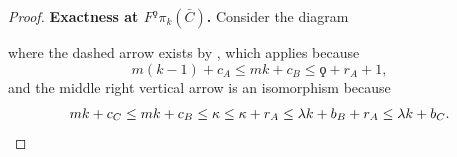 \begin{proof}
  {\bf Exactness at $F^{\qoppa} \pi_k (\bar{C})$.} Consider the diagram
  \begin{center}
  \end{center}
  where the dashed arrow exists by , which applies because
  $$ m(k-1) + c_A \leq mk + c_B \leq \qoppa + r_A + 1,$$
  and the middle right vertical arrow is an isomorphism because
  \[ mk + c_C \leq mk + c_B \leq \kappa \leq \kappa + r_A \leq \lambda k + b_B + r_A \leq \lambda k + b_C. \qedhere \]
\end{proof}

